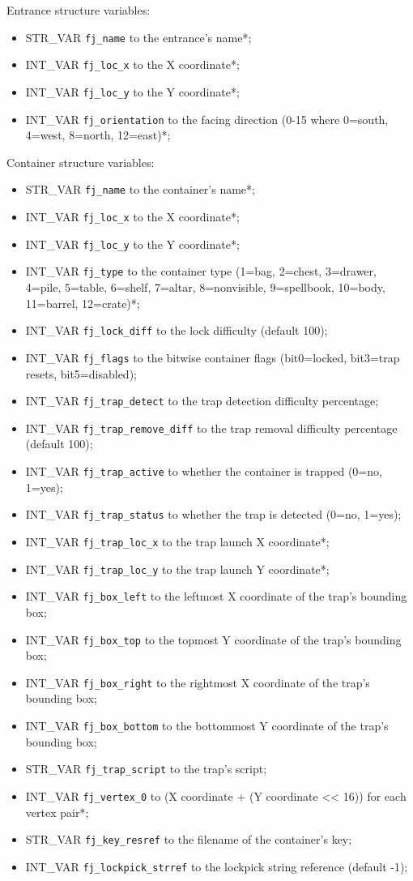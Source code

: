 \documentclass{article}
\begin{document}
Entrance structure variables:
\begin{itemize}
\item STR_VAR \verb+fj_name+ to the entrance's name*;
\item INT_VAR \verb+fj_loc_x+ to the X coordinate*;
\item INT_VAR \verb+fj_loc_y+ to the Y coordinate*;
\item INT_VAR \verb+fj_orientation+ to the facing direction (0-15 where 0=south, 4=west, 8=north, 12=east)*;
\end{itemize}
Container structure variables:
\begin{itemize}
\item STR_VAR \verb+fj_name+ to the container's name*;
\item INT_VAR \verb+fj_loc_x+ to the X coordinate*;
\item INT_VAR \verb+fj_loc_y+ to the Y coordinate*;
\item INT_VAR \verb+fj_type+ to the container type (1=bag, 2=chest, 3=drawer, 4=pile, 5=table, 6=shelf, 7=altar, 8=nonvisible, 9=spellbook, 10=body, 11=barrel, 12=crate)*;
\item INT_VAR \verb+fj_lock_diff+ to the lock difficulty (default 100);
\item INT_VAR \verb+fj_flags+ to the bitwise container flags (bit0=locked, bit3=trap resets, bit5=disabled);
\item INT_VAR \verb+fj_trap_detect+ to the trap detection difficulty percentage;
\item INT_VAR \verb+fj_trap_remove_diff+ to the trap removal difficulty percentage (default 100);
\item INT_VAR \verb+fj_trap_active+ to whether the container is trapped (0=no, 1=yes);
\item INT_VAR \verb+fj_trap_status+ to whether the trap is detected (0=no, 1=yes);
\item INT_VAR \verb+fj_trap_loc_x+ to the trap launch X coordinate*;
\item INT_VAR \verb+fj_trap_loc_y+ to the trap launch Y coordinate*;
\item INT_VAR \verb+fj_box_left+ to the leftmost X coordinate of the trap's bounding box;
\item INT_VAR \verb+fj_box_top+ to the topmost Y coordinate of the trap's bounding box;
\item INT_VAR \verb+fj_box_right+ to the rightmost X coordinate of the trap's bounding box;
\item INT_VAR \verb+fj_box_bottom+ to the bottommost Y coordinate of the trap's bounding box;
\item STR_VAR \verb+fj_trap_script+ to the trap's script;
\item INT_VAR \verb+fj_vertex_0+ to (X coordinate + (Y coordinate << 16)) for each vertex pair*;
\item STR_VAR \verb+fj_key_resref+ to the filename of the container's key;
\item INT_VAR \verb+fj_lockpick_strref+ to the lockpick string reference (default -1);
\end{itemize}
\end{document}
